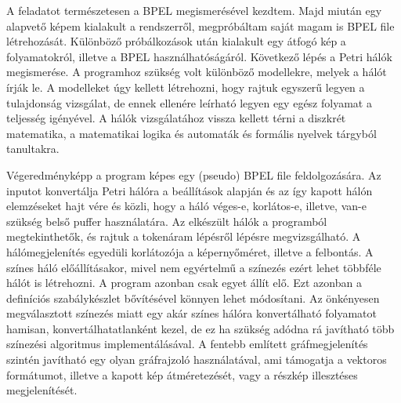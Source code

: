 
A feladatot természetesen a BPEL megismerésével kezdtem. Majd miután egy alapvető képem kialakult a rendszerről, megpróbáltam saját magam is BPEL file létrehozását. Különböző próbálkozások után kialakult egy átfogó kép a folyamatokról, illetve a BPEL használhatóságáról. Következő lépés a Petri hálók megismerése.
A programhoz szükség volt különböző modellekre, melyek a hálót írják le. A modelleket úgy kellett létrehozni, hogy rajtuk egyszerű legyen a tulajdonság vizsgálat, de ennek ellenére leírható legyen egy egész folyamat a teljesség igényével. 
A hálók vizsgálatához vissza kellett térni a diszkrét matematika, a matematikai logika és automaták és formális nyelvek tárgyból tanultakra. 

Végeredményképp a program képes egy (pseudo) BPEL file feldolgozására. Az inputot konvertálja Petri hálóra a beállítások alapján és az így kapott hálón elemzéseket hajt vére és közli, hogy a háló véges-e, korlátos-e, illetve, van-e szükség belső puffer használatára. Az elkészült hálók a programból megtekinthetők, és rajtuk a tokenáram lépésről lépésre megvizsgálható. A hálómegjelenítés egyedüli korlátozója a képernyőméret, illetve a felbontás.  A színes háló előállításakor, mivel nem egyértelmű a színezés ezért lehet többféle hálót is létrehozni. A program azonban csak egyet állít elő. Ezt azonban a definíciós szabálykészlet bővítésével könnyen lehet módosítani. Az önkényesen megválasztott színezés miatt egy akár színes hálóra konvertálható folyamatot hamisan, konvertálhatatlanként kezel, de ez ha szükség adódna rá javítható több színezési algoritmus implementálásával. A fentebb említett gráfmegjelenítés szintén javítható egy olyan gráfrajzoló használatával, ami támogatja a vektoros formátumot, illetve a kapott kép átméretezését, vagy a részkép illesztéses megjelenítését. 